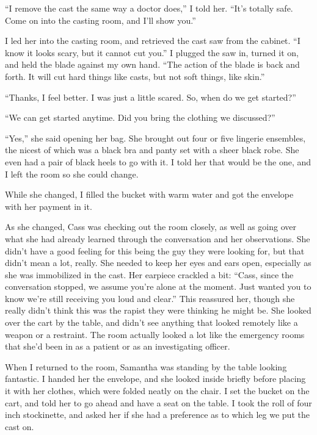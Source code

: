 ``I remove the cast the same way a doctor does,'' I told her. ``It's totally safe. Come on
into the casting room, and I'll show you.''

I led her into the casting room, and retrieved the cast saw from the cabinet. ``I know it
looks scary, but it cannot cut you.'' I plugged the saw in, turned it on, and held the blade
against my own hand. ``The action of the blade is back and forth. It will cut hard things like
casts, but not soft things, like skin.''

``Thanks, I feel better. I was just a little scared. So, when do we get started?''

``We can get started anytime. Did you bring the clothing we discussed?''

``Yes,'' she said opening her bag. She brought out four or five lingerie ensembles, the
nicest of which was a black bra and panty set with a sheer black robe. She even had a pair of
black heels to go with it. I told her that would be the one, and I left the room so she could
change.

While she changed, I filled the bucket with warm water and got the envelope with her
payment in it.

As she changed, Cass was checking out the room closely, as well as going over what she had
already learned through the conversation and her observations. She didn't have a good feeling
for this being the guy they were looking for, but that didn't mean a lot, really. She needed to
keep her eyes and ears open, especially as she was immobilized in the cast. Her earpiece
crackled a bit: ``Cass, since the conversation stopped, we assume you're alone at the moment.
Just wanted you to know we're still receiving you loud and clear.'' This reassured her, though
she really didn't think this was the rapist they were thinking he might be. She looked over the
cart by the table, and didn't see anything that looked remotely like a weapon or a restraint.
The room actually looked a lot like the emergency rooms that she'd been in as a patient or as an
investigating officer.

When I returned to the room, Samantha was standing by the table looking fantastic. I
handed her the envelope, and she looked inside briefly before placing it with her clothes, which
were folded neatly on the chair. I set the bucket on the cart, and told her to go ahead and have
a seat on the table. I took the roll of four inch stockinette, and asked her if she had a
preference as to which leg we put the cast on.

